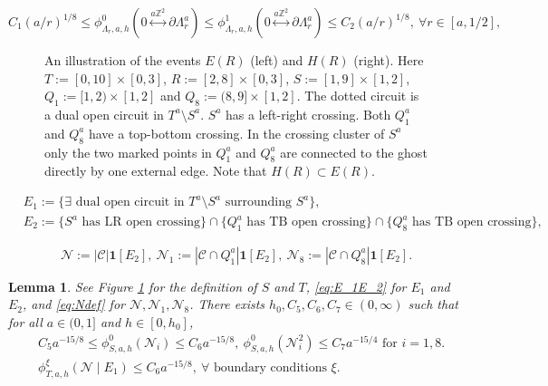 \documentclass[10pt,a4paper]{amsart}
\newtheorem{lemma}{Lemma}
\begin{document}
\begin{equation}\label{eq:onearm}
	C_1(a/r)^{1/8} \leq \phi^0_{\Lambda_{r},a,h}(0 \overset{a\mathbb{Z}^2}{\longleftrightarrow} \partial \Lambda^a_{r}) \leq \phi^1_{\Lambda_{r},a,h}(0 \overset{a\mathbb{Z}^2}{\longleftrightarrow} \partial \Lambda^a_{r}) \leq C_2 (a/r)^{1/8},~\forall r\in [a,1/2], \tag{1-arm}
\end{equation}

	\begin{figure}
		\begin{center}
			
			\caption{An illustration of the events $E(R)$ (left) and $H(R)$ (right). Here $T:=[0,10]\times[0,3]$, $R:=[2,8]\times [0,3]$, $S:=[1,9]\times[1,2]$, $Q_1:=[1,2)\times [1,2]$ and $Q_8:=(8,9]\times[1,2]$. The dotted circuit is a dual open circuit in $T^a\setminus S^a$. $S^a$ has a left-right crossing. Both $Q^a_1$ and $Q^a_8$ have a top-bottom crossing. In the crossing cluster of $S^a$ only the two marked points in $Q^a_1$ and $Q^a_8$ are connected to the ghost directly by one external edge. Note that $H(R)\subset E(R)$.}\label{fig:Looptog}
		\end{center}
	\end{figure}

		\begin{equation}\label{eq:E_1E_2}
			\begin{split}
				&E_1:=\{\exists \text{ dual open circuit in }T^a\setminus S^a \text{ surrounding }S^a\},\\
				&E_2:=\{S^a \text{ has LR open crossing}\}\cap \{Q^a_1 \text{ has TB open crossing}\} \cap \{Q^a_8 \text{ has TB open crossing}\},
			\end{split}
		\end{equation}

    \begin{equation}\label{eq:Ndef}
        \mathcal{N}:=|\mathscr{C}|\mathbf{1}[{E_2}], \ 
        \mathcal{N}_1:=|\mathscr{C}\cap Q_1^a|\mathbf{1}[{E_2}], \  \mathcal{N}_8:=|\mathscr{C}\cap Q_8^a|\mathbf{1}[{E_2}].
    \end{equation}

\begin{lemma}\label{lem:moments}
	See Figure \ref{fig:Looptog} for the definition of $S$ and $T$, \eqref{eq:E_1E_2} for $E_1$ and $E_2$, and \eqref{eq:Ndef} for $\mathcal{N},\mathcal{N}_1,\mathcal{N}_8$.
	There exists $h_0, C_5, C_6, C_7\in(0,\infty)$ such that for all $a\in(0,1]$ and $h\in[0,h_0]$,
	\begin{align*}
		&C_5 a^{-15/8}\leq \phi_{S,a,h}^0(\mathcal{N}_i)\leq C_6 a^{-15/8},~\phi_{S,a,h}^0(\mathcal{N}_i^2)\leq C_7 a^{-15/4} \text{ for }i=1,8.\\
		&\phi_{T,a,h}^{\xi}(\mathcal{N} \mid E_1)\leq C_6 a^{-15/8},~\forall \text{ boundary conditions }\xi.
	\end{align*}
\end{lemma}
\end{document}
